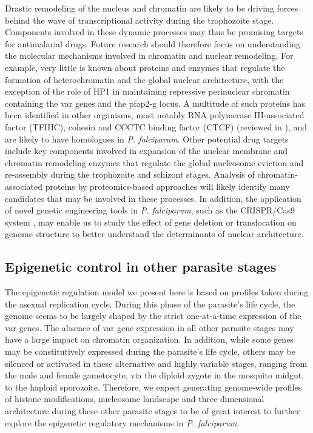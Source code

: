 Drastic remodeling of the nucleus and chromatin are likely to be driving
forces behind the wave of transcriptional activity during the trophozoite
stage. Components involved in these dynamic processes may thus be promising
targets for antimalarial drugs. Future research should therefore focus on
understanding the molecular mechanisms involved in chromatin and nuclear
remodeling. For example, very little is known about proteins and enzymes that
regulate the formation of heterochromatin and the global nuclear architecture,
with the exception of the role of HP1 in maintaining repressive perinuclear
chromatin containing the var genes and the pfap2-g locus. A multitude of such
proteins has been identified in other organisms, most notably RNA polymerase
III-associated factor (TFIIIC), cohesin and CCCTC binding factor (CTCF)
(reviewed in \citep{gomez-diaz:architectural}), and are likely 
to have homologues in \textit{P.
falciparum}. Other
potential drug targets include key components involved in expansion of the
nuclear membrane and chromatin remodeling enzymes that regulate the global
nucleosome eviction and re-assembly during the trophozoite and schizont
stages. Analysis of chromatin-associated proteins by proteomics-based
approaches will likely identify many candidates that may be involved in these
processes. In addition, the application of novel genetic engineering tools in
\textit{P. falciparum}, such as the CRISPR/Cas9 system \citep{ghorbal:genome,
zhang:efficient, wagner:efficient}, may enable us to study
the effect of gene deletion or translocation on genome structure to better
understand the determinants of nuclear architecture.

\subsection{Epigenetic control in other parasite stages}
The epigenetic regulation model we present here is based on profiles taken
during the asexual replication cycle. During this phase of the parasite’s life
cycle, the genome seems to be largely shaped by the strict one-at-a-time
expression of the var genes. The absence of var gene expression in all other
parasite stages may have a large impact on chromatin organization. In
addition, while some genes may be constitutively expressed during the
parasite’s life cycle, others may be silenced or activated in these
alternative and highly variable stages, ranging from the male and female
gametocyte, via the diploid zygote in the mosquito midgut, to the haploid
sporozoite. Therefore, we expect generating genome-wide profiles of histone
modifications, nucleosome landscape and three-dimensional architecture during
these other parasite stages to be of great interest to further explore the
epigenetic regulatory mechanisms in \textit{P. falciparum}. 

